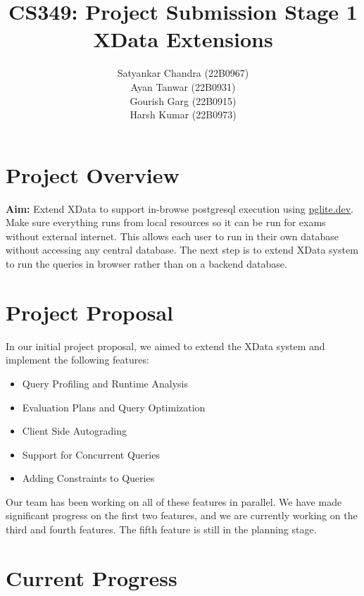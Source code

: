 \documentclass{article}
\begin{document}
\title{\large{CS349: Project Submission Stage 1} \\ \Huge \textbf{XData Extensions}}
\date{}
\author{Satyankar Chandra (22B0967) \\
Ayan Tanwar (22B0931) \\
Gourish Garg (22B0915) \\
Harsh Kumar (22B0973)}
\pagestyle{fancy}

\maketitle

\section{Project Overview}

\textbf{Aim:} Extend XData to support in-browse postgresql execution using \href{https://pglite.dev/}{pglite.dev}. Make sure everything runs from local resources so it can be run for exams without external internet. This allows each user to run in their own database without accessing any central database. The next step is to extend XData system to run the queries in browser rather than on a backend database.

\section{Project Proposal}

In our initial project proposal, we aimed to extend the XData system and implement the following features:
\begin{itemize}
    \item Query Profiling and Runtime Analysis
    \item Evaluation Plans and Query Optimization
    \item Client Side Autograding
    \item Support for Concurrent Queries
    \item Adding Constraints to Queries
\end{itemize}

Our team has been working on all of these features in parallel. We have made significant progress on the first two features, and we are currently working on the third and fourth features. The fifth feature is still in the planning stage.

\section{Current Progress}
\end{document}

